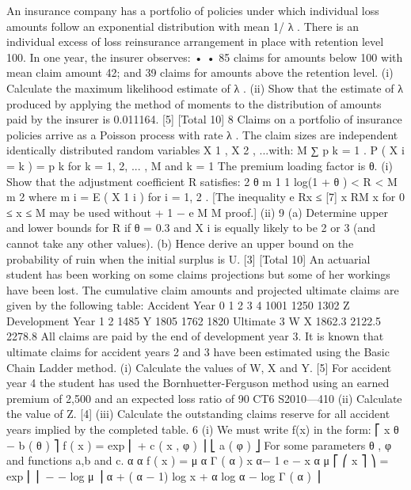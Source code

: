 \documentclass[a4paper,12pt]{article}
\begin{document}
An insurance company has a portfolio of policies under which individual loss amounts follow an exponential distribution with mean 1/ λ . There is an individual excess of loss reinsurance arrangement in place with retention level 100. In one year,
the insurer observes:
•
•
85 claims for amounts below 100 with mean claim amount 42; and
39 claims for amounts above the retention level.
(i) Calculate the maximum likelihood estimate of λ .
(ii) Show that the estimate of λ produced by applying the method of moments to
the distribution of amounts paid by the insurer is 0.011164.
[5]
[Total 10]
8
Claims on a portfolio of insurance policies arrive as a Poisson process with rate λ .
The claim sizes are independent identically distributed random variables
X 1 , X 2 , ...with:
M
∑ p k = 1 .
P ( X i = k ) = p k for k = 1, 2, ... , M and
k = 1
The premium loading factor is θ.
(i)
Show that the adjustment coefficient R satisfies:
2 θ m 1
1
log(1 + θ ) < R <
M
m 2
where m i = E ( X 1 i ) for i = 1, 2 .
[The inequality e Rx ≤
[7]
x RM
x
for 0 ≤ x ≤ M may be used without
+ 1 −
e
M
M
proof.]
(ii)
9
(a) Determine upper and lower bounds for R if θ = 0.3 and X i is equally likely to be 2 or 3 (and cannot take any other values).
(b) Hence derive an upper bound on the probability of ruin when the initial
surplus is U.
[3]
[Total 10]
An actuarial student has been working on some claims projections but some of her workings have been lost. The cumulative claim amounts and projected ultimate
claims are given by the following table:
Accident
Year 0
1
2
3
4 1001
1250
1302
Z
Development Year
1
2
1485
Y
1805
1762
1820
Ultimate
3
W
X
1862.3
2122.5
2278.8
All claims are paid by the end of development year 3.
It is known that ultimate claims for accident years 2 and 3 have been estimated using the Basic Chain Ladder method.
(i)
Calculate the values of W, X and Y.
[5]
For accident year 4 the student has used the Bornhuetter-Ferguson method using an earned premium of 2,500 and an expected loss ratio of 90%
CT6 S2010—410
(ii) Calculate the value of Z.
[4]
(iii) Calculate the outstanding claims reserve for all accident years implied by the completed table.
6
(i)
We must write f(x) in the form:
⎡ x θ − b ( θ )
⎤
f ( x ) = exp ⎢
+ c ( x , φ ) ⎥
⎣ a ( φ )
⎦
For some parameters θ , φ and functions a,b and c.
α α
f ( x ) =
μ α Γ ( α )
x
α− 1
e
−
x α
μ
⎡ ⎛ x
⎤
⎞
= exp ⎢ ⎜ − − log μ ⎟ α + ( α − 1) log x + α log α − log Γ ( α ) ⎥
\end{document}
